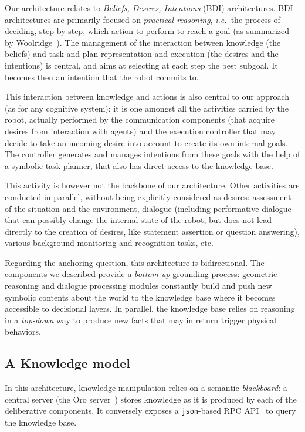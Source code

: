\documentclass[preprint,3p,times]{elsarticle}
\newcommand{\ie}{{\textit{i.e.\ }}}
\begin{document}
Our architecture relates to \emph{Beliefs, Desires, Intentions} (BDI)
architectures. BDI architectures are primarily focused on \emph{practical
reasoning}, \ie the process of deciding, step by step, which action to perform
to reach a goal (as summarized by Woolridge~\cite{Woolridge1999}). The
management of the interaction between knowledge (the beliefs) and task and plan
representation and execution (the desires and the intentions) is central, and
aims at selecting at each step the best subgoal. It becomes then an intention
that the robot commits to.

This interaction between knowledge and actions is also central to our approach
(as for any cognitive system): it is one amongst all the activities carried by
the robot, actually performed by the communication components (that acquire
desires from interaction with agents) and the execution controller that may
decide to take an incoming desire into account to create its own internal
goals. The controller generates and manages intentions from these goals with
the help of a symbolic task planner, that also has direct access to the
knowledge base.

This activity is however not the backbone of our architecture. Other
activities are conducted in parallel, without being explicitly considered as
desires: assessment of the situation and the environment, dialogue (including
performative dialogue that can possibly change the internal state of the robot,
but does not lead directly to the creation of desires, like statement assertion or
question answering), various background monitoring and recognition tasks, etc.

Regarding the anchoring question, this architecture is bidirectional. The
components we described provide a \textit{bottom-up} grounding process:
geometric reasoning and dialogue processing modules constantly build and push
new symbolic contents about the world to the knowledge base where it becomes
accessible to decisional layers. In parallel, the knowledge base relies on
reasoning in a \textit{top-down} way to produce new facts that may in return
trigger physical behaviors.

\subsection{A Knowledge model}

In this architecture, knowledge manipulation relies on a
semantic \emph{blackboard}: a central server (the {\sc Oro}
server~\cite{Lemaignan2010}) stores knowledge as it is produced by each of the
deliberative components. It conversely exposes a {\tt json}-based RPC
API~\cite{lemaignan2012kbapi} to query the knowledge base.
\end{document}
